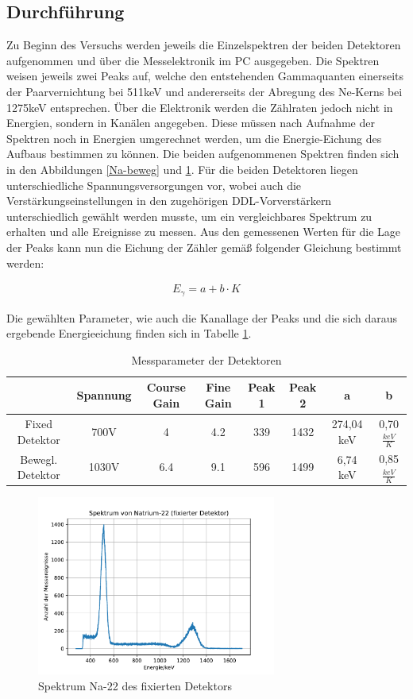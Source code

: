 \documentclass[11pt]{scrartcl}
\begin{document}
\subsection{Durchführung}
Zu Beginn des Versuchs werden jeweils die Einzelspektren der beiden Detektoren aufgenommen und über die Messelektronik im PC ausgegeben. Die Spektren weisen jeweils zwei Peaks auf, welche den entstehenden Gammaquanten einerseits der Paarvernichtung bei 511keV und andererseits der Abregung des Ne-Kerns bei 1275keV entsprechen. Über die Elektronik werden die Zählraten jedoch nicht in Energien, sondern in Kanälen angegeben. Diese müssen nach Aufnahme der Spektren noch in Energien umgerechnet werden, um die Energie-Eichung des Aufbaus bestimmen zu können. Die beiden aufgenommenen Spektren finden sich in den Abbildungen \ref{Na-beweg} und \ref{Na-fixed}. Für die beiden Detektoren liegen unterschiedliche Spannungsversorgungen vor, wobei auch die Verstärkungseinstellungen in den zugehörigen DDL-Vorverstärkern unterschiedlich gewählt werden musste, um ein vergleichbares Spektrum zu erhalten und alle Ereignisse zu messen. Aus den gemessenen Werten für die Lage der Peaks kann nun die Eichung der Zähler gemäß folgender Gleichung bestimmt werden:

\begin{align}
E_\gamma = a + b \cdot K
\end{align}

Die gewählten Parameter, wie auch die Kanallage der Peaks und die sich daraus ergebende Energieeichung finden sich in Tabelle \ref{para}. 

\begin{table}[h]
	\caption{Messparameter der Detektoren}
	\begin{tabular}{|c|c|c|c|c|c|c|c|}
	\hline
	 & Spannung & Course Gain & Fine Gain & Peak 1 & Peak 2 & a & b\\ \hline
	 Fixed Detektor & 700V & 4 & 4.2 & 339 & 1432 & 274,04 keV & 0,70 $\frac{keV}{K}$\\ \hline
	 Bewegl. Detektor & 1030V & 6.4 & 9.1 & 596 & 1499 & 6,74 keV & 0,85 $\frac{keV}{K}$\\ \hline
	\end{tabular}
\label{para}
\end{table}

\begin{figure}[htbp]  
     \includegraphics[width=0.7\textwidth]{Spektrum_von_Natrium-22_(fixierter_Detektor).pdf}
  \caption{Spektrum Na-22 des fixierten Detektors}
  \label{Na-fixed}
\end{figure}
\end{document}
